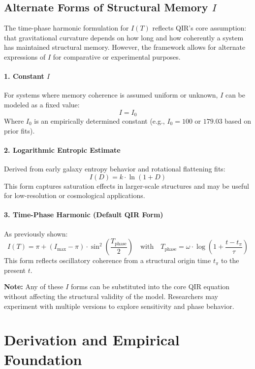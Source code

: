 \documentclass[11pt]{article}
\begin{document}
\subsection{Alternate Forms of Structural Memory $I$}

The time-phase harmonic formulation for $I(T)$ reflects QIR's core assumption: that gravitational curvature depends on how long and how coherently a system has maintained structural memory. However, the framework allows for alternate expressions of $I$ for comparative or experimental purposes.

\paragraph{1. Constant $I$}
For systems where memory coherence is assumed uniform or unknown, $I$ can be modeled as a fixed value:
\[
I = I_0
\]
Where $I_0$ is an empirically determined constant (e.g., $I_0 = 100$ or $179.03$ based on prior fits).

\paragraph{2. Logarithmic Entropic Estimate}
Derived from early galaxy entropy behavior and rotational flattening fits:
\[
I(D) = k \cdot \ln(1 + D)
\]
This form captures saturation effects in larger-scale structures and may be useful for low-resolution or cosmological applications.

\paragraph{3. Time-Phase Harmonic (Default QIR Form)}
As previously shown:
\[
I(T) = \pi + (I_{\text{max}} - \pi) \cdot \sin^2\left(\frac{T_{\text{phase}}}{2}\right)
\quad \text{with} \quad T_{\text{phase}} = \omega \cdot \log\left(1 + \frac{t - t_\pi}{\tau} \right)
\]
This form reflects oscillatory coherence from a structural origin time $t_\pi$ to the present $t$.

\textbf{Note:} Any of these $I$ forms can be substituted into the core QIR equation without affecting the structural validity of the model. Researchers may experiment with multiple versions to explore sensitivity and phase behavior.

\section{Derivation and Empirical Foundation}
\end{document}
